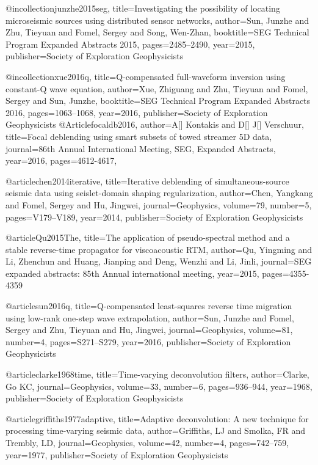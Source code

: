 @incollection{junzhe2015seg,
  title={Investigating the possibility of locating microseismic sources using distributed sensor networks},
  author={Sun, Junzhe and Zhu, Tieyuan and Fomel, Sergey and Song, Wen-Zhan},
  booktitle={SEG Technical Program Expanded Abstracts 2015},
  pages={2485--2490},
  year={2015},
  publisher={Society of Exploration Geophysicists}
}

@incollection{xue2016q,
  title={Q-compensated full-waveform inversion using constant-Q wave equation},
  author={Xue, Zhiguang and Zhu, Tieyuan and Fomel, Sergey and Sun, Junzhe},
  booktitle={SEG Technical Program Expanded Abstracts 2016},
  pages={1063--1068},
  year={2016},
  publisher={Society of Exploration Geophysicists}
}
@Article{focaldb2016,
  author={A[] Kontakis and D[] J[] Verschuur},
  title={Focal deblending using smart subsets of towed streamer 5{D} data},
  journal={86th Annual International Meeting, SEG, Expanded Abstracts},
  year=2016,
  pages={4612-4617},
}

@article{chen2014iterative,
  title={Iterative deblending of simultaneous-source seismic data using seislet-domain shaping regularization},
  author={Chen, Yangkang and Fomel, Sergey and Hu, Jingwei},
  journal={Geophysics},
  volume={79},
  number={5},
  pages={V179--V189},
  year={2014},
  publisher={Society of Exploration Geophysicists}
}

@article{Qu2015The,
  title={The application of pseudo-spectral method and a stable reverse-time propagator for viscoacoustic {RTM}},
  author={Qu, Yingming and Li, Zhenchun and Huang, Jianping and Deng, Wenzhi and Li, Jinli},
  journal={SEG expanded abstracts: 85th Annual international meeting},
  year={2015},
  pages={4355-4359}
}

@article{sun2016q,
  title={Q-compensated least-squares reverse time migration using low-rank one-step wave extrapolation},
  author={Sun, Junzhe and Fomel, Sergey and Zhu, Tieyuan and Hu, Jingwei},
  journal={Geophysics},
  volume={81},
  number={4},
  pages={S271--S279},
  year={2016},
  publisher={Society of Exploration Geophysicists}
}

@article{clarke1968time,
  title={Time-varying deconvolution filters},
  author={Clarke, Go KC},
  journal={Geophysics},
  volume={33},
  number={6},
  pages={936--944},
  year={1968},
  publisher={Society of Exploration Geophysicists}
}

@article{griffiths1977adaptive,
  title={Adaptive deconvolution: A new technique for processing time-varying seismic data},
  author={Griffiths, LJ and Smolka, FR and Trembly, LD},
  journal={Geophysics},
  volume={42},
  number={4},
  pages={742--759},
  year={1977},
  publisher={Society of Exploration Geophysicists}
}


